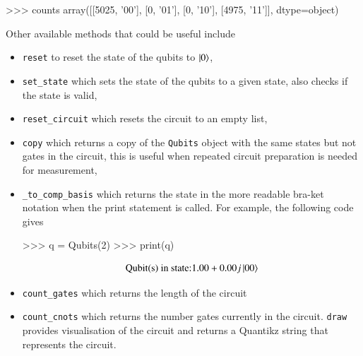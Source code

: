 \begin{mycode}
>>> counts
array([[5025, '00'],
       [0, '01'],
       [0, '10'],
       [4975, '11']], dtype=object)
\end{mycode}
Other available methods that could be useful include
\begin{itemize}
	\item \texttt{reset} to reset the state of the qubits to $ \ket{0} $,
	\item \texttt{set\_state} which sets the state of the qubits to a given state, also checks if the state is valid,
	\item \texttt{reset\_circuit} which resets the circuit to an empty list,
	\item \texttt{copy} which returns a copy of the \texttt{Qubits} object with the same states but not gates in the circuit, this is useful when repeated circuit preparation is needed for measurement,
	\item \texttt{\_to\_comp\_basis} which returns the state in the more readable bra-ket notation when the print statement is called. For example, the following code gives
\begin{mycode}
	>>> q = Qubits(2)
	>>> print(q)	
\end{mycode} 
	\[ \text{Qubit(s) in state:} 1.00+0.00j\ket{00} \]
	\item \texttt{count\_gates} which returns the length of the circuit
	\item \texttt{count\_cnots} which returns the number \cnot gates currently in the circuit.
	\texttt{draw} provides visualisation of the circuit and returns a Quantikz \missingref string that represents the circuit.
\end{itemize}


